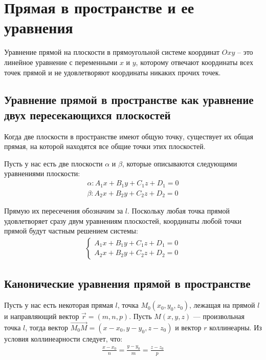 \documentclass[a4paper,12pt]{extbook}
\theoremstyle{named}
\theoremstyle{named}
\begin{document}



\section{Прямая в пространстве и ее уравнения}\label{sec:line_in_space}
Уравнение прямой на плоскости в прямоугольной системе координат \(Oxy\) – это линейное уравнение с переменными \(x\) и \(y\), которому отвечают координаты всех точек прямой и не удовлетворяют координаты никаких прочих точек.

\subsection*{Уравнение прямой в пространстве как уравнение двух пересекающихся плоскостей}
Когда две плоскости в пространстве имеют общую точку, существует их общая прямая, на которой находятся все общие точки этих плоскостей.

Пусть у нас есть две плоскости \(\alpha\) и \(\beta\), которые описываются следующими уравнениями плоскости:
\begin{gather*}
    \alpha: A_1x + B_1y + C_1z + D_1 = 0 \\
    \beta: A_2x + B_2y + C_2z + D_2 = 0
\end{gather*}

Прямую их пересечения обозначим за \(l\). Поскольку любая точка прямой удовлетворяет сразу двум уравнениям плоскостей, координаты любой точки прямой будут частным решением системы:
\begin{gather*}
    \begin{cases}
        A_1x + B_1y + C_1z + D_1 = 0 \\
        A_2x + B_2y + C_2z + D_2 = 0
    \end{cases}
\end{gather*}

\subsection*{Канонические уравнения прямой в пространстве}
Пусть у нас есть некоторая прямая \(l\), точка \(M_0(x_0, y_0, z_0)\), лежащая на прямой \(l\) и направляющий вектор \(\overrightarrow{r} = (m, n, p)\). Пусть \(M(x, y, z)\) — произвольная точка \(l\), тогда вектор \(\overrightarrow{M_0M} = (x - x_0, y - y_0, z - z_0)\) и вектор \(r\) коллинеарны. Из условия коллинеарности следует, что:
\begin{gather*}
    \frac{x - x_0}{n} = \frac{y - y_0}{m} = \frac{z - z_0}{p}
\end{gather*}
\end{document}
